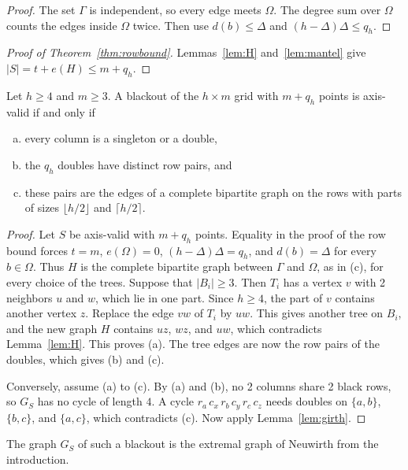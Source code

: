 \begin{proof}
The set $\Gamma$ is independent, so every edge meets $\Omega$. The degree sum over $\Omega$
counts the edges inside $\Omega$ twice. Then use $d(b)\le\Delta$ and
$(h-\Delta)\Delta\le q_h$.
\end{proof}

\begin{proof}[Proof of Theorem~\ref{thm:rowbound}]
Lemmas~\ref{lem:H} and~\ref{lem:mantel} give $|S|=t+e(H)\le m+q_h$.
\end{proof}

\begin{theorem}\label{thm:equality}
Let $h\ge4$ and $m\ge3$. A blackout of the $h\times m$ grid with $m+q_h$ points is
axis-valid if and only if
\begin{enumerate}[(a)]
\item every column is a singleton or a double,
\item the $q_h$ doubles have distinct row pairs, and
\item these pairs are the edges of a complete bipartite graph on the rows with parts of
sizes $\lfloor h/2\rfloor$ and $\lceil h/2\rceil$.
\end{enumerate}
\end{theorem}

\begin{proof}
Let $S$ be axis-valid with $m+q_h$ points. Equality in the proof of the row bound forces
$t=m$, $e(\Omega)=0$, $(h-\Delta)\Delta=q_h$, and $d(b)=\Delta$ for every $b\in\Omega$.
Thus $H$ is the complete bipartite graph between $\Gamma$ and $\Omega$, as in (c), for
every choice of the trees. Suppose that $|B_i|\ge3$. Then $T_i$ has a vertex $v$ with 2
neighbors $u$ and $w$, which lie in one part. Since $h\ge4$, the part of $v$ contains
another vertex $z$. Replace the edge $vw$ of $T_i$ by $uw$. This gives another tree on
$B_i$, and the new graph $H$ contains $uz$, $wz$, and $uw$, which contradicts
Lemma~\ref{lem:H}. This proves (a). The tree edges are now the row pairs of the doubles,
which gives (b) and (c).

Conversely, assume (a) to (c). By (a) and (b), no 2 columns share 2 black rows, so $G_S$
has no cycle of length $4$. A cycle $r_a\,c_x\,r_b\,c_y\,r_c\,c_z$ needs doubles on
$\{a,b\}$, $\{b,c\}$, and $\{a,c\}$, which contradicts (c). Now apply
Lemma~\ref{lem:girth}.
\end{proof}

The graph $G_S$ of such a blackout is the extremal graph of Neuwirth from the
introduction.

